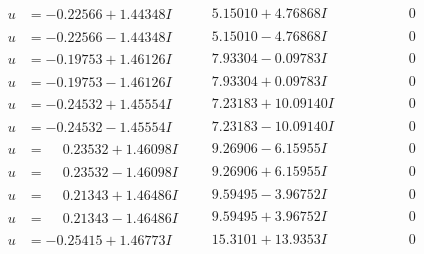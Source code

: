 \documentclass[1p]{elsarticle_modified}
\theoremstyle{definition}
\begin{document}
$$\begin{array}{c|c|c}
\begin{aligned}
u &= -0.22566 + 1.44348 I\end{aligned}
 & \phantom{-}5.15010 + 4.76868 I & \phantom{-0.000000 } 0 \\ \hline\begin{aligned}
u &= -0.22566 - 1.44348 I\end{aligned}
 & \phantom{-}5.15010 - 4.76868 I & \phantom{-0.000000 } 0 \\ \hline\begin{aligned}
u &= -0.19753 + 1.46126 I\end{aligned}
 & \phantom{-}7.93304 - 0.09783 I & \phantom{-0.000000 } 0 \\ \hline\begin{aligned}
u &= -0.19753 - 1.46126 I\end{aligned}
 & \phantom{-}7.93304 + 0.09783 I & \phantom{-0.000000 } 0 \\ \hline\begin{aligned}
u &= -0.24532 + 1.45554 I\end{aligned}
 & \phantom{-}7.23183 + 10.09140 I & \phantom{-0.000000 } 0 \\ \hline\begin{aligned}
u &= -0.24532 - 1.45554 I\end{aligned}
 & \phantom{-}7.23183 - 10.09140 I & \phantom{-0.000000 } 0 \\ \hline\begin{aligned}
u &= \phantom{-}0.23532 + 1.46098 I\end{aligned}
 & \phantom{-}9.26906 - 6.15955 I & \phantom{-0.000000 } 0 \\ \hline\begin{aligned}
u &= \phantom{-}0.23532 - 1.46098 I\end{aligned}
 & \phantom{-}9.26906 + 6.15955 I & \phantom{-0.000000 } 0 \\ \hline\begin{aligned}
u &= \phantom{-}0.21343 + 1.46486 I\end{aligned}
 & \phantom{-}9.59495 - 3.96752 I & \phantom{-0.000000 } 0 \\ \hline\begin{aligned}
u &= \phantom{-}0.21343 - 1.46486 I\end{aligned}
 & \phantom{-}9.59495 + 3.96752 I & \phantom{-0.000000 } 0 \\ \hline\begin{aligned}
u &= -0.25415 + 1.46773 I\end{aligned}
 & \phantom{-}15.3101 + 13.9353 I & \phantom{-0.000000 } 0 \\ \hline\begin{aligned}

\end{aligned}
\end{array}$$
\end{document}
